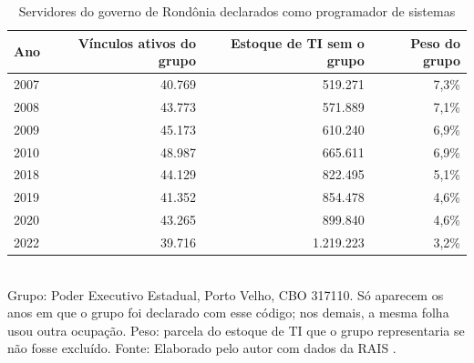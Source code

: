 \begin{table}[htbp]
    \centering
    \caption{Servidores do governo de Rondônia declarados como programador de sistemas}
    \label{tab:artefato-ro}
    \footnotesize
    \renewcommand{\arraystretch}{1.25}
    \begin{tabular}{lrrr}
        \toprule
        \rowcolor{black!8}
        \textbf{Ano} & \textbf{Vínculos ativos do grupo} & \textbf{Estoque de TI sem o grupo} & \textbf{Peso do grupo} \\
        \midrule
        2007 & 40.769 & 519.271 & 7,3\% \\
        2008 & 43.773 & 571.889 & 7,1\% \\
        2009 & 45.173 & 610.240 & 6,9\% \\
        2010 & 48.987 & 665.611 & 6,9\% \\
        2018 & 44.129 & 822.495 & 5,1\% \\
        2019 & 41.352 & 854.478 & 4,6\% \\
        2020 & 43.265 & 899.840 & 4,6\% \\
        2022 & 39.716 & 1.219.223 & 3,2\% \\
        \bottomrule
    \end{tabular}
    \\[4pt]
    Grupo: Poder Executivo Estadual, Porto Velho, CBO 317110. Só aparecem os anos em que o grupo foi declarado com esse código; nos demais, a mesma folha usou outra ocupação. Peso: parcela do estoque de TI que o grupo representaria se não fosse excluído. Fonte: Elaborado pelo autor com dados da RAIS \cite{RAIS2024}.
\end{table}
